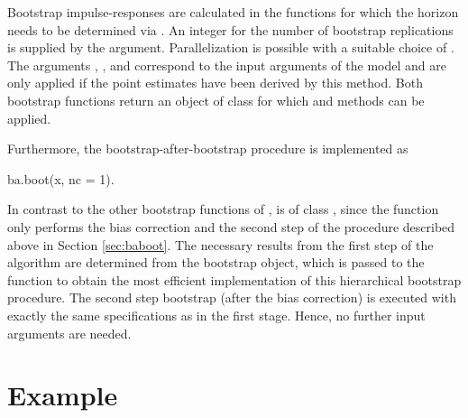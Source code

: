 \documentclass[nojss]{jss}\usepackage[]{graphicx}\usepackage[]{color}
\begin{document}
Bootstrap impulse-responses are calculated in the functions for which the horizon needs to be determined via . An integer for the number of bootstrap replications is supplied by the  argument. Parallelization is possible with a suitable choice of . The arguments , ,  and  correspond to the input arguments of the  model and are only applied if the point estimates have been derived by this method. Both bootstrap functions return an object of class  for which  and  methods can be applied.

Furthermore, the bootstrap-after-bootstrap procedure is implemented as
\begin{CodeChunk}
\begin{CodeInput}
ba.boot(x, nc = 1).
\end{CodeInput}
\end{CodeChunk}
In contrast to the other bootstrap functions of ,  is of class , since the function only performs the bias correction and the second step of the procedure described above in Section \ref{sec:baboot}. The necessary results from the first step of the algorithm are determined from the bootstrap object, which is passed to the function to obtain the most efficient implementation of this hierarchical bootstrap procedure. The second step bootstrap (after the bias correction) is executed with exactly the same specifications as in the first stage. Hence, no further input arguments are needed.
\\



\section{Example}\label{sec:Example}
\end{document}
